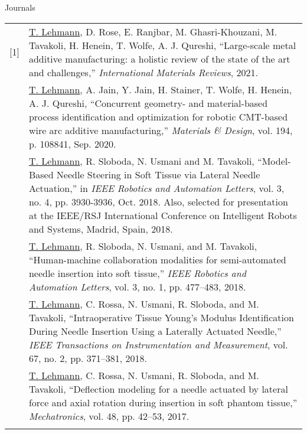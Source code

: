 

\begin{cventries}

  \cvpub
    {Journals}{
      \begin{longtable}{p{0.5cm} p{\textwidth - 0.5cm}}
        [1] & \underline{T. Lehmann}, D. Rose, E. Ranjbar, M. Ghasri-Khouzani, M. Tavakoli, H. Henein, T. Wolfe, A. J. Qureshi, ``Large-scale metal additive manufacturing: a holistic review of the state of the art and challenges,'' \emph{International Materials Reviews}, 2021. \\\relax
        [2] & \underline{T. Lehmann}, A. Jain, Y. Jain, H. Stainer, T. Wolfe, H. Henein, A. J. Qureshi, ``Concurrent geometry- and material-based process identification and optimization for robotic CMT-based wire arc additive manufacturing,'' \emph{Materials \& Design}, vol. 194, p. 108841, Sep. 2020. \\\relax
        [3] & \underline{T. Lehmann}, R. Sloboda, N. Usmani and M. Tavakoli, ``Model-Based Needle Steering in Soft Tissue via Lateral Needle Actuation,'' in \emph{IEEE Robotics and Automation Letters}, vol. 3, no. 4, pp. 3930-3936, Oct. 2018. Also, selected for presentation at the IEEE/RSJ International Conference on Intelligent Robots and Systems, Madrid, Spain, 2018. \\\relax
        [4] & \underline{T. Lehmann}, R. Sloboda, N. Usmani, and M. Tavakoli, ``Human-machine collaboration modalities for semi-automated needle insertion into soft tissue,'' \emph{IEEE Robotics and Automation Letters}, vol. 3, no. 1, pp. 477–483, 2018. \\\relax
        [5] & \underline{T. Lehmann}, C. Rossa, N. Usmani, R. Sloboda, and M. Tavakoli, ``Intraoperative Tissue Young’s Modulus Identification During Needle Insertion Using a Laterally Actuated Needle,'' \emph{IEEE Transactions on Instrumentation and Measurement}, vol. 67, no. 2, pp. 371–381, 2018. \\\relax
        [6] & \underline{T. Lehmann}, C. Rossa, N. Usmani, R. Sloboda, and M. Tavakoli, ``Deflection modeling for a needle actuated by lateral force and axial rotation during insertion in soft phantom tissue,'' \emph{Mechatronics}, vol. 48, pp. 42–53, 2017. \\\relax

\end{longtable}}
\end{cventries}
